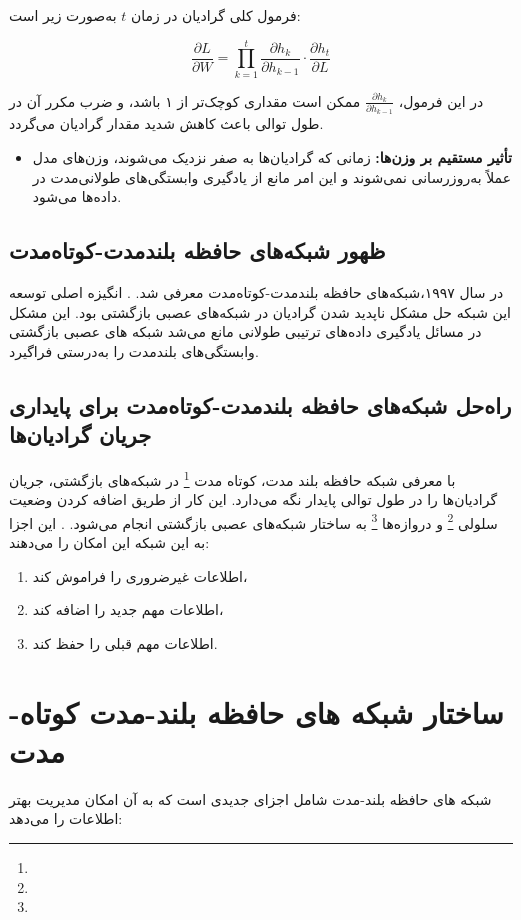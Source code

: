 فرمول کلی گرادیان در زمان \( t \) به‌صورت زیر است:

\begin{equation}
	\frac{\partial L}{\partial W} = \prod_{k=1}^{t} \frac{\partial h_k}{\partial h_{k-1}} \cdot \frac{\partial h_t}{\partial L}
\end{equation}

در این فرمول، \( \frac{\partial h_k}{\partial h_{k-1}} \) ممکن است مقداری کوچک‌تر از ۱ باشد، و ضرب مکرر آن در طول توالی باعث کاهش شدید مقدار گرادیان می‌گردد.

\begin{itemize}
	\item \textbf{تأثیر مستقیم بر وزن‌ها:}
	زمانی که گرادیان‌ها به صفر نزدیک می‌شوند، وزن‌های مدل عملاً به‌روزرسانی نمی‌شوند و این امر مانع از یادگیری وابستگی‌های طولانی‌مدت در داده‌ها می‌شود\cite{goodfellow2016deep}.
\end{itemize}

\subsection{ظهور شبکه‌های حافظه بلندمدت-کوتاه‌مدت}
در سال ۱۹۹۷،شبکه‌های حافظه بلندمدت-کوتاه‌مدت  معرفی شد.
\cite{hochreiter1997long}.
انگیزه اصلی توسعه این شبکه حل مشکل ناپدید شدن گرادیان در شبکه‌های عصبی بازگشتی بود. این مشکل در مسائل یادگیری داده‌های ترتیبی طولانی مانع می‌شد شبکه های عصبی بازگشتی وابستگی‌های بلندمدت را به‌درستی فراگیرد.

\subsection{راه‌حل شبکه‌های حافظه بلندمدت-کوتاه‌مدت برای پایداری جریان گرادیان‌ها}
 با معرفی شبکه حافظه بلند مدت، کوتاه مدت \footnote{} در شبکه‌های بازگشتی، جریان گرادیان‌ها را در طول توالی پایدار نگه می‌دارد. این کار از طریق اضافه کردن وضعیت سلولی \footnote{} و دروازه‌ها \footnote{} به ساختار شبکه‌های عصبی بازگشتی انجام می‌شود.
\cite{gers1999learning}.
این اجزا به این شبکه این امکان را می‌دهند:

\begin{enumerate}
	\item اطلاعات غیرضروری را فراموش کند،
	\item اطلاعات مهم جدید را اضافه کند،
	\item اطلاعات مهم قبلی را حفظ کند.
\end{enumerate}

\section{ساختار شبکه های حافظه بلند-مدت کوتاه-مدت}
شبکه های حافظه بلند-مدت  شامل اجزای جدیدی است که به آن امکان مدیریت بهتر اطلاعات را می‌دهد:




